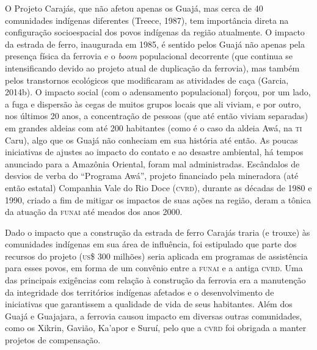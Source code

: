 O Projeto Carajás, que não afetou apenas os Guajá, mas cerca de 40
comunidades indígenas diferentes (Treece, 1987), tem importância direta
na configuração socioespacial dos povos indígenas da região atualmente.
O impacto da estrada de ferro, inaugurada em 1985, é sentido pelos Guajá
não apenas pela presença física da ferrovia e o \emph{boom} populacional
decorrente (que continua se intensificando devido ao projeto atual de
duplicação da ferrovia), mas também pelos transtornos ecológicos que
modificaram as atividades de caça (Garcia, 2014b). O impacto social (com
o adensamento populacional) forçou, por um lado, a fuga e dispersão às
cegas de muitos grupos locais que ali viviam, e por outro, nos últimos
20 anos, a concentração de pessoas (que até então viviam separadas) em
grandes aldeias com até 200 habitantes (como é o caso da aldeia
Awá, na \textsc{ti} Caru), algo que os Guajá não conheciam em sua história
até então. As poucas iniciativas de ajustes ao impacto do contato e ao
desastre ambiental, há tempos anunciado para a Amazônia Oriental, foram
mal administradas. Escândalos de desvios de verba do ``Programa Awá'',
projeto financiado pela mineradora (até então estatal) Companhia Vale do
Rio Doce (\textsc{cvrd}), durante as décadas de 1980 e 1990, criado a fim de
mitigar os impactos de suas ações na região, deram a tônica da atuação
da \textsc{funai} até meados dos anos 2000.

Dado o impacto que a construção da estrada de ferro Carajás traria (e
trouxe) às comunidades indígenas em sua área de influência, foi
estipulado que parte dos recursos do projeto (\textsc{us}\$ 300 milhões) seria
aplicada em programas de assistência para esses povos, em forma de um
convênio entre a \textsc{funai} e a antiga \textsc{cvrd}. Uma das principais exigências
com relação à construção da ferrovia era a manutenção da integridade dos
territórios indígenas afetados e o desenvolvimento de iniciativas que
garantissem a qualidade de vida de seus habitantes. Além dos Guajá e
Guajajara, a ferrovia causou impacto em diversas outras comunidades,
como os Xikrin, Gavião, Ka'apor e Suruí, pelo que a \textsc{cvrd} foi obrigada a
manter projetos de compensação.

